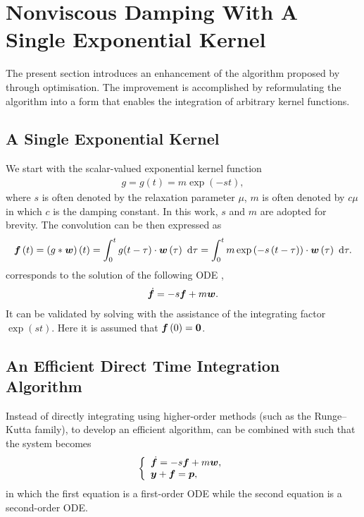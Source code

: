 \section{Nonviscous Damping With A Single Exponential Kernel}
The present section introduces an enhancement of the algorithm proposed by \citet{Adhikari2004} through optimisation. The improvement is accomplished by reformulating the algorithm into a form that enables the integration of arbitrary kernel functions.
\subsection{A Single Exponential Kernel}
We start with the scalar-valued exponential kernel function
\begin{gather}
g=g\left(t\right)=m\exp\left(-st\right),
\end{gather}
where $s$ is often denoted by the relaxation parameter $\mu$, $m$ is often denoted by $c\mu$ in which $c$ is the damping constant. In this work, $s$ and $m$ are adopted for brevity.
The convolution can be then expressed as
\begin{gather}\label{eq:single_conv}
\bm{f}\left(t\right)=\left(g*\bm{w}\right)\left(t\right)=\int_0^tg(t-\tau)\cdot\bm{w}\left(\tau\right)~\mathrm{d}\tau=\int_0^tm\exp\left(-s\left(t-\tau\right)\right)\cdot\bm{w}\left(\tau\right)~\mathrm{d}\tau.
\end{gather}
 corresponds to the solution of the following ODE \citep[see, e.g.,][\S~80]{Zwillinger2021},
\begin{gather}\label{eq:single_conv_ode}
\dot{\bm{f}}=-s\bm{f}+m\bm{w}.
\end{gather}
It can be validated by solving  with the assistance of the integrating factor $\exp\left(st\right)$. Here it is assumed that $\bm{f}\left(0\right)=\bm{0}$.
\subsection{An Efficient Direct Time Integration Algorithm}
Instead of directly integrating  using higher-order methods (such as the Runge--Kutta family), to develop an efficient algorithm,  can be combined with  such that the system becomes
\begin{gather}\label{eq:eqv_sys}
\left\{
\begin{array}{l}
\dot{\bm{f}}=-s\bm{f}+m\bm{w},\\
\bm{y}+\bm{f}=\bm{p},
\end{array}\right.
\end{gather}
in which the first equation is a first-order ODE while the second equation is a second-order ODE.

